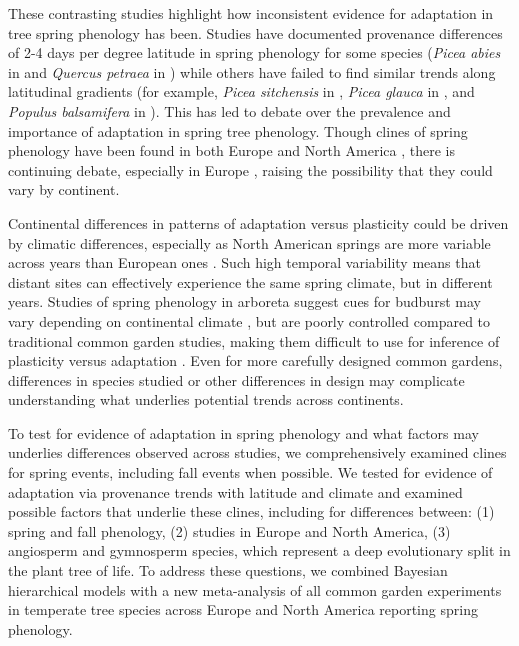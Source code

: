 \documentclass[12pt]{article}
\begin{document}
These contrasting studies highlight how inconsistent evidence for adaptation in tree spring phenology has been. Studies have documented provenance differences of 2-4 days per degree latitude in spring phenology for some species (\emph{Picea abies} in \citealp{sog08} and \emph{Quercus petraea} in \citealp{deans96}) while others have failed to find similar trends along latitudinal gradients (for example, \emph{Picea sitchensis} in \citealp{mimura07}, \emph{Picea glauca} in \citealp{Li97}, and \emph{Populus balsamifera} in \citealp{farmer93}). This has led to debate over the prevalence and importance of adaptation in spring tree phenology. Though clines of spring phenology have been found in both Europe \citep{sog08,deans96,von95} and North America \citep{rossi15, soo13, hannerz99}, there is continuing debate, especially in Europe \citep{deans96,vitasse2009,Basler:2012}, raising the possibility that they could vary by continent. 

Continental differences in patterns of adaptation versus plasticity could be driven by climatic differences, especially as North American springs are more variable across years than European ones \citep{tward21,zohner2017,schwartz00}. Such high temporal variability means that distant sites can effectively experience the same spring climate, but in different years. Studies of spring phenology in arboreta suggest cues for budburst may vary depending on continental climate \citep{zohner2017}, but are poorly controlled compared to traditional common garden studies, making them difficult to use for inference of plasticity versus adaptation \citep{gauzere2020}. Even for more carefully designed common gardens, differences in species studied or other differences in design may complicate understanding what underlies potential trends across continents.  %

To test for evidence of adaptation in spring phenology and what factors may underlies differences observed across studies, we comprehensively examined clines for spring events, including fall events when possible. We tested for evidence of adaptation via provenance trends with latitude and climate and examined possible factors that underlie these clines, including for differences between: (1) spring and fall phenology, (2) studies in Europe and North America, (3) angiosperm and gymnosperm species, which represent a deep evolutionary split in the plant tree of life. To address these questions, we combined Bayesian hierarchical models with a new meta-analysis of all common garden experiments in temperate tree species across Europe and North America reporting spring phenology. %
\end{document}
